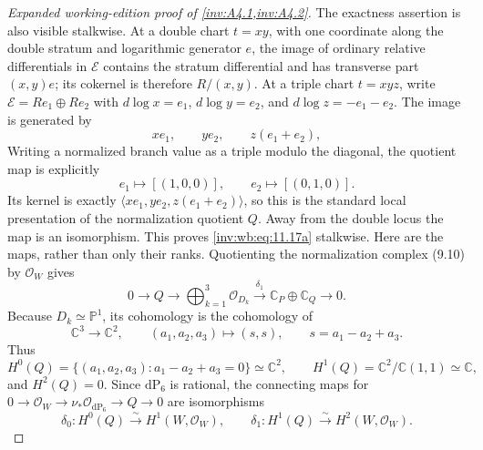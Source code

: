 \begin{proof}[Expanded working-edition proof of \cref{inv:A4.1,inv:A4.2}]
The exactness assertion is also visible stalkwise.  At a double chart $t=xy$, with one
coordinate along the double stratum and logarithmic generator $e$, the image
of ordinary relative differentials in $\mathcal E$ contains the stratum
differential and has transverse part $(x,y)e$; its cokernel is therefore
$R/(x,y)$.  At a triple chart $t=xyz$, write
$\mathcal E=Re_1\oplus Re_2$ with
$d\log x=e_1$, $d\log y=e_2$, and
$d\log z=-e_1-e_2$.  The image is generated by
\[
 xe_1,\qquad ye_2,\qquad z(e_1+e_2),
\]
Writing a normalized branch value as a triple modulo the diagonal, the
quotient map is explicitly
\[
 e_1\longmapsto[(1,0,0)],\qquad
 e_2\longmapsto[(0,1,0)].
\tag{WBH.11.17a$''$}\label{inv:wb:eq:11.17a-doubleprime}
\]
Its kernel is exactly
$\langle xe_1,ye_2,z(e_1+e_2)\rangle$, so this is the standard local
presentation of the normalization quotient $Q$.
Away from the double locus the map is an isomorphism.  This proves \eqref{inv:wb:eq:11.17a}
stalkwise.
Here are the maps, rather than only their ranks.  Quotienting the normalization
complex (9.10) by $\mathcal O_W$ gives
\[
 0\longrightarrow Q\longrightarrow
 \bigoplus_{k=1}^3\mathcal O_{D_k}
 \xrightarrow{\delta_1}\mathbb C_P\oplus\mathbb C_Q
 \longrightarrow0.
\]
Because $D_k\simeq\mathbb P^1$, its cohomology is the cohomology of
\[
 \mathbb C^3\longrightarrow\mathbb C^2,\qquad
 (a_1,a_2,a_3)\longmapsto(s,s),\qquad s=a_1-a_2+a_3.
\]
Thus
\[
 H^0(Q)=\{(a_1,a_2,a_3):a_1-a_2+a_3=0\}\simeq\mathbb C^2,
 \qquad H^1(Q)=\mathbb C^2/\mathbb C(1,1)\simeq\mathbb C,
\tag{WBH.11.17b}\label{inv:wb:eq:11.17b}
\]
and $H^2(Q)=0$.  Since $\mathrm{dP}_6$ is rational, the connecting maps for
$0\to\mathcal O_W\to\nu_*\mathcal O_{\mathrm{dP}_6}\to Q\to0$ are
isomorphisms
\[
 \delta_0:H^0(Q)\xrightarrow{\sim}H^1(W,\mathcal O_W),
 \qquad
 \delta_1:H^1(Q)\xrightarrow{\sim}H^2(W,\mathcal O_W).
\tag{WBH.11.17c}\label{inv:wb:eq:11.17c}
\]


\end{proof}
